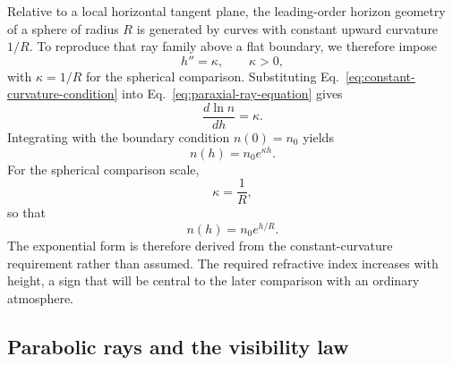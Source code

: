 Relative to a local horizontal tangent plane, the leading-order horizon
geometry of a sphere of radius $R$ is generated by curves with constant upward
curvature $1/R$. To reproduce that ray family above a flat
boundary, we therefore impose
\begin{equation}
    h''=\kappa,
    \qquad
    \kappa>0,
    \label{eq:constant-curvature-condition}
\end{equation}
with $\kappa=1/R$ for the spherical comparison. Substituting Eq.~\eqref{eq:constant-curvature-condition} into
Eq.~\eqref{eq:paraxial-ray-equation} gives
\begin{equation}
    \frac{d\ln n}{dh}=\kappa.
\end{equation}
Integrating with the boundary condition $n(0)=n_0$ yields
\begin{equation}
    n(h)=n_0 e^{\kappa h}.
    \label{eq:paraxial-exponential-profile}
\end{equation}
For the spherical comparison scale,
\begin{equation}
    \kappa=\frac{1}{R},
\end{equation}
so that
\begin{equation}
    n(h)=n_0 e^{h/R}.
    \label{eq:earth-scale-exponential-profile}
\end{equation}
The exponential form is therefore derived from the constant-curvature
requirement rather than assumed. The required refractive index increases with
height, a sign that will be central to the later comparison with an ordinary
atmosphere.

\subsection{Parabolic rays and the visibility law}

